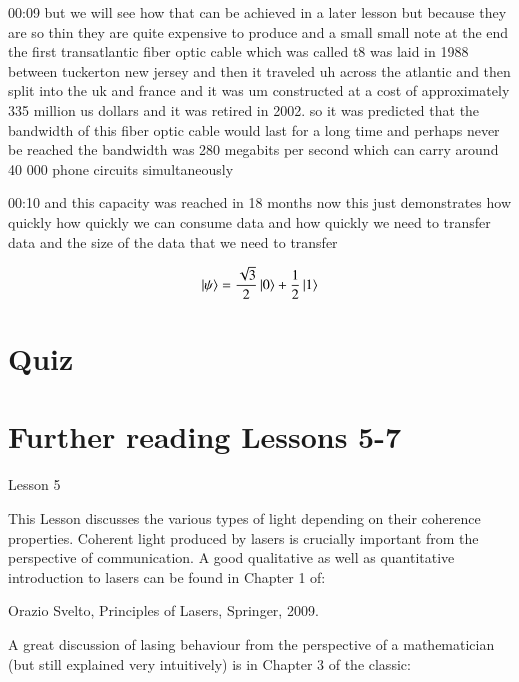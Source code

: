 00:09
but we will see how that can be achieved in a later lesson
but because they are so thin they are quite expensive to produce
and a small small note at the end the first transatlantic fiber optic cable
which was called t8 was laid in 1988 between tuckerton new jersey
and then it traveled uh across the atlantic and then split
into the uk and france and it was um constructed at a cost of approximately 335
million us dollars and it was retired in 2002.
so it was predicted that the bandwidth of this fiber optic cable would last for
a long time and perhaps never be reached the bandwidth was 280 megabits per
second which can carry around 40 000 phone circuits simultaneously

00:10
and this capacity was reached in 18 months
now this just demonstrates how quickly how quickly we can consume data and how
quickly we need to transfer data and the size of
the data that we need to transfer


\newpage
\begin{exercises}
\begin{equation*}
\ket{\psi} = \frac{\sqrt{3}}{2}\ket{0} + \frac{1}{2}\ket{1}
\end{equation*}


\end{exercises}

\newpage
\section{Quiz}

\section{Further reading Lessons 5-7}

Lesson 5

This Lesson discusses the various types of light depending on their coherence properties. Coherent light produced by lasers is crucially important from the perspective of communication. A good qualitative as well as quantitative introduction to lasers can be found in Chapter 1 of:

Orazio Svelto, Principles of Lasers, Springer, 2009.

A great discussion of lasing behaviour from the perspective of a mathematician (but still explained very intuitively) is in Chapter 3 of the classic:

